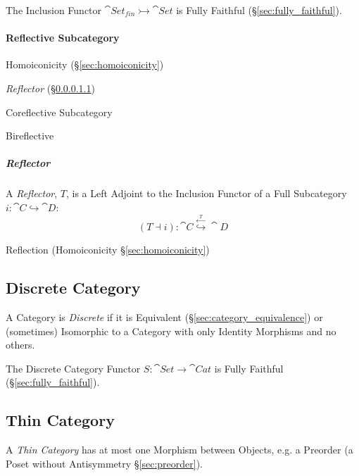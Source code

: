 The Inclusion Functor $\cat{Set}_{fin} \rightarrowtail
\cat{Set}$ is Fully Faithful (\S\ref{sec:fully_faithful}).



\paragraph{Reflective Subcategory}\label{sec:reflective_subcategory}\hfill

Homoiconicity (\S\ref{sec:homoiconicity})

\emph{Reflector} (\S\ref{sec:reflector})

Coreflective Subcategory

Bireflective



\subparagraph{Reflector}\label{sec:reflector}\hfill


A \emph{Reflector}, $T$, is a Left Adjoint to the Inclusion Functor of
a Full Subcategory $i : \cat{C} \hookrightarrow \cat{D}$:
\[
  (T \dashv i) :
  \cat{C} \stackrel{\xleftarrow{T}}{\hookrightarrow} \cat{D}
\]

Reflection (Homoiconicity \S\ref{sec:homoiconicity})



\subsection{Discrete Category}\label{sec:discrete_category}

A Category is \emph{Discrete} if it is Equivalent
(\S\ref{sec:category_equivalence}) or (sometimes) Isomorphic to a
Category with only Identity Morphisms and no others.

The Discrete Category Functor $S : \cat{Set} \rightarrow
\cat{Cat}$ is Fully Faithful (\S\ref{sec:fully_faithful}).



\subsection{Thin Category}\label{sec:thin_category}

A \emph{Thin Category} has at most one Morphism between Objects, e.g.
a Preorder (a Poset without Antisymmetry \S\ref{sec:preorder}).

